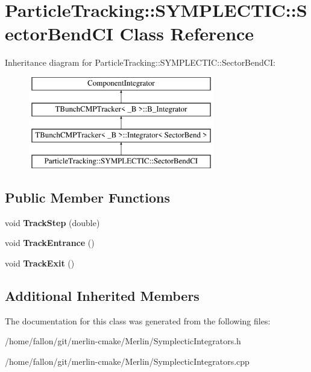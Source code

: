 \hypertarget{classParticleTracking_1_1SYMPLECTIC_1_1SectorBendCI}{}\section{Particle\+Tracking\+:\+:S\+Y\+M\+P\+L\+E\+C\+T\+IC\+:\+:Sector\+Bend\+CI Class Reference}
\label{classParticleTracking_1_1SYMPLECTIC_1_1SectorBendCI}
Inheritance diagram for Particle\+Tracking\+:\+:S\+Y\+M\+P\+L\+E\+C\+T\+IC\+:\+:Sector\+Bend\+CI\+:\begin{figure}[H]
\begin{center}
\leavevmode
\includegraphics[height=4.000000cm]{classParticleTracking_1_1SYMPLECTIC_1_1SectorBendCI}
\end{center}
\end{figure}
\subsection*{Public Member Functions}
\begin{DoxyCompactItemize}
\item 
\mbox{\label{classParticleTracking_1_1SYMPLECTIC_1_1SectorBendCI_a61bf932baf2b3e9eefd14c273c7ac9f4}} 
void {\bfseries Track\+Step} (double)
\item 
\mbox{\label{classParticleTracking_1_1SYMPLECTIC_1_1SectorBendCI_ad6000721b44c8f83b08492ce95a8fd5c}} 
void {\bfseries Track\+Entrance} ()
\item 
\mbox{\label{classParticleTracking_1_1SYMPLECTIC_1_1SectorBendCI_ac139b8d8d920ef63663057d147047963}} 
void {\bfseries Track\+Exit} ()
\end{DoxyCompactItemize}
\subsection*{Additional Inherited Members}


The documentation for this class was generated from the following files\+:\begin{DoxyCompactItemize}
\item 
/home/fallon/git/merlin-\/cmake/\+Merlin/Symplectic\+Integrators.\+h\item 
/home/fallon/git/merlin-\/cmake/\+Merlin/Symplectic\+Integrators.\+cpp\end{DoxyCompactItemize}
